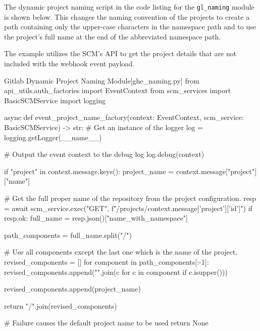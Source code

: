 The dynamic project naming script in the code listing for the \texttt{gl\_naming}
module is shown below.  This changes the naming convention of the projects to create
a path containing only the upper-case characters in the namespace path and to use
the project's full name at the end of the abbreviated namespace path.

The example utilizes the SCM's API to get the project details that are not included
with the webhook event payload.\\

\begin{code}{Gitlab Dynamic Project Naming Module}{[ghe\_naming.py]}{}
from api_utils.auth_factories import EventContext
from scm_services import BasicSCMService
import logging

async def event_project_name_factory(context: EventContext, scm_service: BasicSCMService) -> str:
    # Get an instance of the logger
    log = logging.getLogger(__name__)

    # Output the event context to the debug log
    log.debug(context)

    if "project" in context.message.keys():
        project_name = context.message["project"]["name"]

        # Get the full proper name of the repository from the project configuration.
        resp = await scm_service.exec("GET", f"/projects/{context.message['project']['id']}")
        if resp.ok:
            full_name = resp.json()["name_with_namespace"]

            path_components = full_name.split("/")

            # Use all components except the last one which is the name of the project.
            revised_components = []
            for component in path_components[:-1]:
                revised_components.append("".join(c for c in component if c.isupper()))
            
            revised_components.append(project_name)

            return "/".join(revised_components)


    # Failure causes the default project name to be used
    return None

\end{code}
